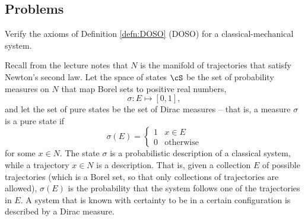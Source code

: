 





\subsection{Problems}
\begin{problem}
Verify the axioms of Definition \ref{defn:DOSO} (DOSO) for a classical-mechanical system.
\end{problem}

Recall from the lecture notes that $N$ is the manifold of trajectories that satisfy Newton's second law. Let the space of states $\cS$ be the set of probability measures on $N$ that map Borel sets to positive real numbers,
\begin{equation*}
    \sigma: E \mapsto [0, 1],
\end{equation*}
and let the set of pure states be the set of Dirac measures -- that is, a measure $\sigma$ is a pure state if
\begin{equation*}
    \sigma(E) = \begin{cases}
        1 & x \in E\\
        0 & \text{otherwise}
    \end{cases}
\end{equation*}
for some $x \in N$. The state $\sigma$ is a probabilistic description of a classical system, while a trajectory $x \in N$ is a  description. That is, given a collection $E$ of possible trajectories (which is a Borel set, so that only  collections of trajectories are allowed), $\sigma(E)$ is the probability that the system follows one of the trajectories in $E$. A system that is known with certainty to be in a certain configuration is described by a Dirac measure.

